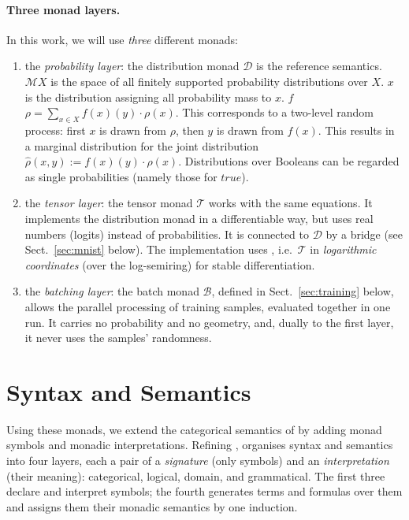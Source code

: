 \documentclass[anon]{../../journal-templates/NeSy26/nesy2026} %
\begin{document}
\paragraph{Three monad layers.} In this work, we will use \emph{three} different monads:
\begin{enumerate}
\item the \emph{probability layer}: the distribution monad $\mathcal D$ \citep{schellhornNeSyCatCategorical2026} is the reference semantics. ${\mathcal M} X$ is the space of all finitely supported probability distributions over $X$.  $x$ is the distribution assigning all probability mass to $x$. $f$ \minth{>>=} $\rho = \sum_{x\in X}\!f(x)(y)\cdot\rho(x)$. This corresponds to a two-level random process: first $x$ is drawn from $\rho$, then $y$ is drawn from $f(x)$. This results in a marginal distribution for the joint distribution $\hat\rho(x,y):= f(x)(y) \cdot \rho(x)$.
 Distributions over Booleans can be regarded as single
  probabilities (namely those for $\mathit{true}$). 
\item the \emph{tensor layer}: the tensor monad $\mathcal{T}$ works with the same equations. It implements the distribution monad in a differentiable way, but uses real numbers (logits) instead
  of probabilities. It is connected to $\mathcal D$ by a bridge (see Sect.~\ref{sec:mnist} below). The implementation uses , i.e.\ $\mathcal{T}$
  in \emph{logarithmic coordinates} (over the log-semiring) for stable differentiation.
\item the \emph{batching layer}: the batch monad $\mathcal B$, defined in Sect.~\ref{sec:training} below, allows the parallel
  processing of training samples, evaluated together in one run. It carries no probability and no
  geometry, and, dually to the first layer, it never uses the samples' randomness.
\end{enumerate}

\section{Syntax and Semantics}
\label{sec:syntax-semantics}
Using these monads, we extend the categorical semantics of \citet[D1.1.]{johnstoneElephant2002} by adding monad symbols and monadic interpretations.
Refining \citep{schellhornNeSyCatCategorical2026}, \nesycattorch organises syntax and semantics into four layers,
each a pair of a \emph{signature} (only symbols) and an \emph{interpretation} (their meaning):
categorical, logical, domain, and grammatical. The first three declare and interpret
symbols; the fourth generates terms and formulas over them and assigns them their monadic
semantics by one induction.
\end{document}
